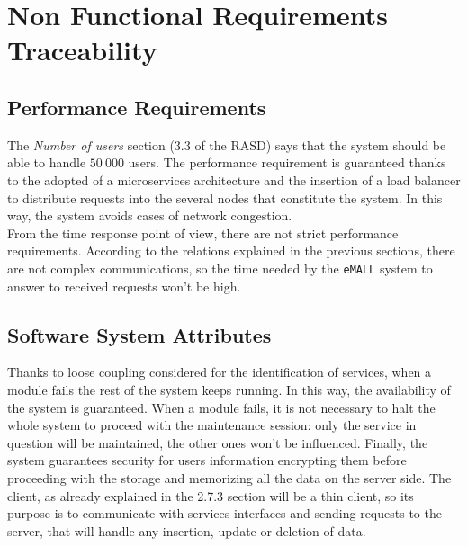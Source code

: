 \section{Non Functional Requirements Traceability}
\label{sec: non_functional_requirements_traceability}%

\subsection{Performance Requirements}
\label{subsec:performance_requirements}%
The \textit{Number of users} section (3.3 of the RASD) says that the system should be able to handle $50\ 000$ users.
The performance requirement is guaranteed thanks to the adopted of a microservices architecture and
the insertion of a load balancer to distribute requests into the several nodes that constitute the system.
In this way, the system avoids cases of network congestion. \\
From the time response point of view, there are not strict performance requirements.
According to the relations explained in the previous sections, there are not complex communications, so the time needed
by the \verb|eMALL| system to answer to received requests won't be high.

\subsection{Software System Attributes}
\label{subsec:software_system_attributes}%
Thanks to loose coupling considered for the identification of services, when a module fails the rest of the system keeps running.
In this way, the availability of the system is guaranteed.
When a module fails, it is not necessary to halt the whole system to proceed with the maintenance session:
only the service in question will be maintained, the other ones won't be influenced.
Finally, the system guarantees security for users information encrypting them before proceeding with the storage
and memorizing all the data on the server side.
The client, as already explained in the 2.7.3 section will be a thin client, so its purpose is to communicate with services
interfaces and sending requests to the server, that will handle any insertion, update or deletion of data.